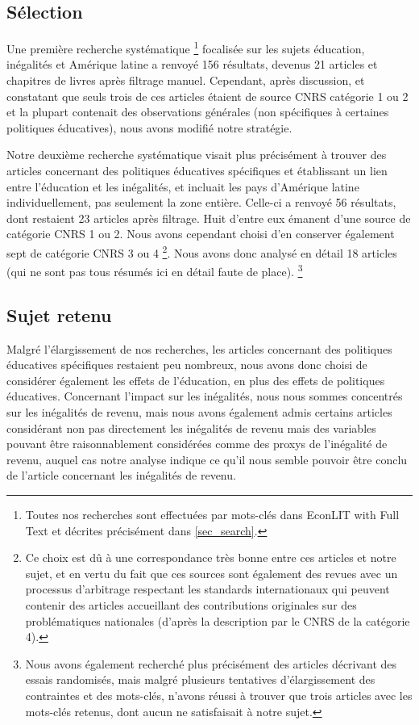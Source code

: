 \documentclass[pagesize, twoside=off, bibliography=totoc, DIV=calc, fontsize=12pt, a4paper, french]{scrartcl}
\begin{document}
\subsection{Sélection}

Une première recherche systématique \footnote{Toutes nos recherches sont effectuées par mots-clés dans EconLIT with Full Text et décrites précisément dans \cref{sec_search}.} focalisée sur les sujets éducation, inégalités et Amérique latine a renvoyé 156 résultats, devenus 21 articles et chapitres de livres après filtrage manuel. Cependant, après discussion, et constatant que seuls trois de ces articles étaient de source CNRS catégorie 1 ou 2 et la plupart contenait des observations générales (non spécifiques à certaines politiques éducatives), nous avons modifié notre stratégie.

Notre deuxième recherche systématique visait plus précisément à trouver des articles concernant des politiques éducatives spécifiques et établissant un lien entre l’éducation et les inégalités, et incluait les pays d’Amérique latine individuellement, pas seulement la zone entière. Celle-ci a renvoyé 56 résultats, dont restaient 23 articles après filtrage. Huit d’entre eux émanent d’une source de catégorie CNRS 1 ou 2. Nous avons cependant choisi d’en conserver également sept de catégorie CNRS 3 ou 4 \footnote{Ce choix est dû à une correspondance très bonne entre ces articles et notre sujet, et en vertu du fait que ces sources sont également \og{}des revues avec un processus d’arbitrage respectant les standards internationaux\fg{} qui peuvent contenir des articles accueillant des contributions originales sur des problématiques nationales (d’après la description par le CNRS de la catégorie 4).}. Nous avons donc analysé en détail 18 articles (qui ne sont pas tous résumés ici en détail faute de place). \footnote{\label{ft_rct}Nous avons également recherché plus précisément des articles décrivant des essais randomisés, mais malgré plusieurs tentatives d’élargissement des contraintes et des mots-clés, n’avons réussi à trouver que trois articles avec les mots-clés retenus, dont aucun ne satisfaisait à notre sujet.}

\subsection{Sujet retenu}

Malgré l’élargissement de nos recherches, les articles concernant des politiques éducatives spécifiques restaient peu nombreux, nous avons donc choisi de considérer également les effets de l’éducation, en plus des effets de politiques éducatives. Concernant l’impact sur les inégalités, nous nous sommes concentrés sur les inégalités de revenu, mais nous avons également admis certains articles considérant non pas directement les inégalités de revenu mais des variables pouvant être raisonnablement considérées comme des proxys de l’inégalité de revenu, auquel cas notre analyse indique ce qu’il nous semble pouvoir être conclu de l’article concernant les inégalités de revenu.
\end{document}
